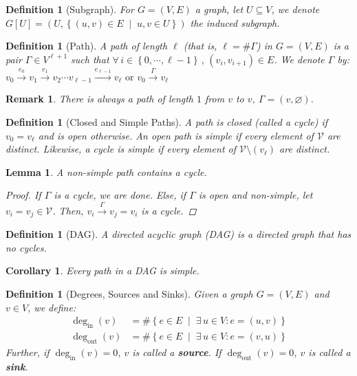 \documentclass[12pt]{article}
\let\emptyset\varnothing
\newcommand{\set}[2]{\left\{{#1}\;\middle|\;{#2}\right\}}
\newcommand{\Forall}[1]{\forall\,{#1}\,,\,}
\newcommand{\Exist}[1]{\exists\,{#1}:}
\newcommand{\seq}[2][0]{\left\{{#1},\cdots,{#2}\right\}}
\newcommand{\rto}[1]{\overset{\displaystyle #1}{\longrightarrow}}
\newcommand*{\degin}{\deg_{\text{in}}}
\newcommand*{\degout}{\deg_{\text{out}}}
\newtheorem{definition}[theorem]{Definition}
\newtheorem{lemma}[theorem]{Lemma}
\newtheorem{corollary}[theorem]{Corollary}
\newtheorem{remark}[theorem]{Remark}
\begin{document}
\begin{definition}[Subgraph]
  \label{def_induced}
  For $G=(V,E)$ a graph, let $U\subseteq V$, we denote $G[U]=(U,\set{(u,v)\in E}{u,v\in U})$ the induced subgraph.
\end{definition}

\begin{definition}[Path]
  A path of length $\ell$ (that is, $\ell=\#\Gamma$) in $G=(V,E)$ is a pair $\Gamma\in V^{\ell+1}$ such that $\Forall{i\in\seq{\ell-1}} (v_i,v_{i+1})\in E$. We denote $\Gamma$ by: $v_0\rto{e_0}v_1\rto{e_1}v_2\cdots v_{\ell-1}\rto{e_{\ell-1}}v_\ell\text{ or }v_0\rto{\Gamma} v_\ell$
\end{definition}

\begin{remark}
  \label{null_path}
  There is always a path of length $1$ from $v$ to $v$, $\Gamma=(v,\emptyset)$.
\end{remark}

\begin{definition}[Closed and Simple Paths]
  A path is closed (called a cycle) if $v_0=v_\ell$ and is open otherwise. An open path is simple if every element of $\mathcal{V}$ are distinct. Likewise, a cycle is simple if every element of $\mathcal{V}\setminus(v_\ell)$ are distinct.
\end{definition}

\begin{lemma}
  A non-simple path contains a cycle.
  \begin{proof}
    If $\Gamma$ is a cycle, we are done. Else, if $\Gamma$ is open and non-simple, let $v_i=v_j\in\mathcal{V}$. Then, $v_i\rto{\Gamma}v_j=v_i$ is a cycle.
  \end{proof}
\end{lemma}

\begin{definition}[DAG]
  A directed acyclic graph (DAG) is a directed graph that has no cycles.
\end{definition}

\begin{corollary}
  Every path in a DAG is simple.
\end{corollary}

\begin{definition}[Degrees, Sources and Sinks]
  Given a graph $G=(V,E)$ and $v\in V$, we define:
  \begin{align*}
    \degin(v)&=\#\set{e\in E}{\Exist{u\in V} e=(u,v)}\\
    \degout(v)&=\#\set{e\in E}{\Exist{u\in V} e=(v,u)}
  \end{align*}
  Further, if $\degin(v)=0$, $v$ is called a \textbf{source}. If $\degout(v)=0$, $v$ is called a \textbf{sink}.
\end{definition}
\end{document}
